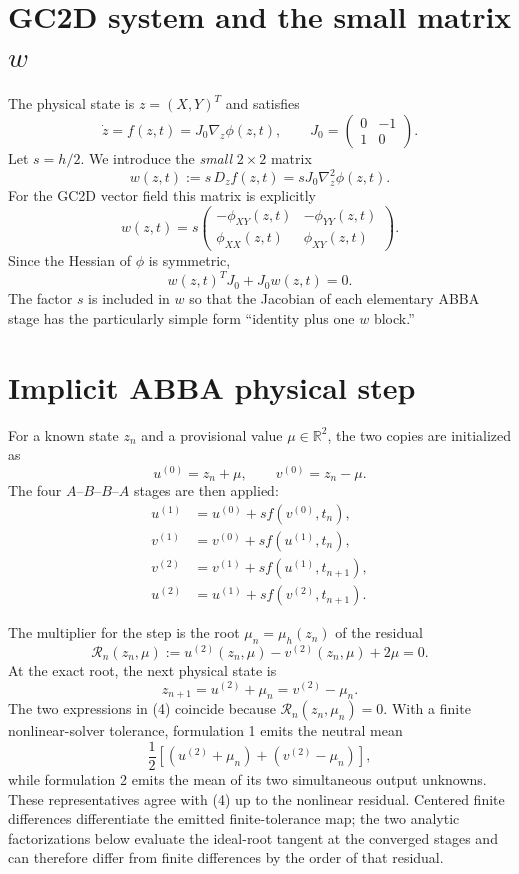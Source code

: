 \documentclass[11pt,a4paper]{article}
\newcommand{\R}{\mathbb{R}}
\begin{document}
\section{GC2D system and the small matrix \texorpdfstring{$w$}{w}}

The physical state is $z=(X,Y)^T$ and satisfies
\[
 \dot z=f(z,t)=J_0\nabla_z\phi(z,t),
 \qquad
 J_0=
 \begin{pmatrix}
  0&-1\\
  1&0
 \end{pmatrix}.
\]
Let $s=h/2$. We introduce the \emph{small} $2\times2$ matrix
\[
 \boxed{
 w(z,t):=s\,D_zf(z,t)=sJ_0\nabla_z^2\phi(z,t).
 }
\]
For the GC2D vector field this matrix is explicitly
\[
 \boxed{
 w(z,t)=
 s\begin{pmatrix}
  -\phi_{XY}(z,t)&-\phi_{YY}(z,t)\\
  \phi_{XX}(z,t)&\phi_{XY}(z,t)
 \end{pmatrix}.
 }
 \tag{1}
\]
Since the Hessian of $\phi$ is symmetric,
\[
 w(z,t)^TJ_0+J_0w(z,t)=0.
\]
The factor $s$ is included in $w$ so that the Jacobian of each elementary ABBA stage has
the particularly simple form ``identity plus one $w$ block.''

\section{Implicit ABBA physical step}

For a known state $z_n$ and a provisional value $\mu\in\R^2$, the two copies are
initialized as
\[
 u^{(0)}=z_n+\mu,
 \qquad
 v^{(0)}=z_n-\mu.
\]
The four $A$--$B$--$B$--$A$ stages are then applied:
\begin{align}
 u^{(1)}&=u^{(0)}+s f(v^{(0)},t_n), \tag{2a}\\
 v^{(1)}&=v^{(0)}+s f(u^{(1)},t_n), \tag{2b}\\
 v^{(2)}&=v^{(1)}+s f(u^{(1)},t_{n+1}), \tag{2c}\\
 u^{(2)}&=u^{(1)}+s f(v^{(2)},t_{n+1}). \tag{2d}
\end{align}

The multiplier for the step is the root $\mu_n=\mu_h(z_n)$ of the residual
\[
 \boxed{
 \mathcal R_n(z_n,\mu)
 :=u^{(2)}(z_n,\mu)-v^{(2)}(z_n,\mu)+2\mu=0.
 }
 \tag{3}
\]
At the exact root, the next physical state is
\[
 \boxed{
 z_{n+1}=u^{(2)}+\mu_n=v^{(2)}-\mu_n.
 }
 \tag{4}
\]
The two expressions in (4) coincide because $\mathcal R_n(z_n,\mu_n)=0$.
With a finite nonlinear-solver tolerance, formulation 1 emits the neutral mean
\[
 \frac12\left[(u^{(2)}+\mu_n)+(v^{(2)}-\mu_n)\right],
\]
while formulation 2 emits the mean of its two simultaneous output unknowns.  These
representatives agree with (4) up to the nonlinear residual.  Centered finite
differences differentiate the emitted finite-tolerance map; the two analytic
factorizations below evaluate the ideal-root tangent at the converged stages and can
therefore differ from finite differences by the order of that residual.
\end{document}
